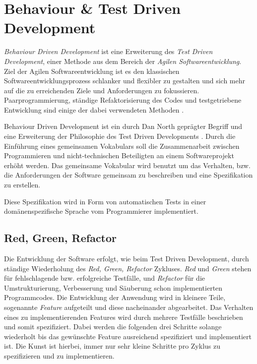\section{Behaviour \& Test Driven Development}

\textit{Behaviour Driven Development} ist eine Erweiterung des
\textit{Test Driven Development}, einer Methode aus dem Bereich der
\textit{Agilen Softwareentwicklung}. Ziel der Agilen
Softwareentwicklung ist es den klassischen Softwareentwicklungsprozess
schlanker und flexibler zu gestalten und sich mehr auf die zu
erreichenden Ziele und Anforderungen zu
fokussieren. Paarprogrammierung, ständige Refaktorisierung des Codes
und testgetriebene Entwicklung sind einige der dabei verwendeten
Methoden \cite{wiki:agile}.

Behaviour Driven Development ist ein durch Dan North geprägter Begriff
und eine Erweiterung der Philosophie des Test Driven Developments
\cite{wiki:bdd}. Durch die Einführung eines gemeinsamen Vokabulars
soll die Zusammenarbeit zwischen Programmieren und nicht-technischen
Beteiligten an einem Softwareprojekt erhöht werden. Das gemeinsame
Vokabular wird benutzt um das Verhalten, bzw. die Anforderungen der
Software gemeinsam zu beschreiben und eine Spezifikation zu erstellen.

Diese Spezifikation wird in Form von automatischen Tests in einer
domänen\-spezifische Sprache vom Programmierer implementiert.

\subsection{Red, Green, Refactor}

Die Entwicklung der Software erfolgt, wie beim Test Driven
Development, durch ständige Wiederholung des \textit{Red, Green,
  Refactor} Zykluses. \textit{Red} und \textit{Green} stehen für
fehlschlagende bzw. erfolgreiche Testfälle, und \textit{Refactor} für
die Umstrukturierung, Verbesserung und Säuberung schon implementierten
Programmcodes. Die Entwicklung der Anwendung wird in kleinere Teile,
sogenannte \textit{Feature} aufgeteilt und diese nacheinander
abgearbeitet. Das Verhalten eines zu implementierenden Features wird
durch mehrere Testfälle beschrieben und somit spezifiziert. Dabei
werden die folgenden drei Schritte solange wiederholt bis das
gewünschte Feature ausreichend spezifiziert und implementiert ist. Die
Kunst ist hierbei, immer nur sehr kleine Schritte pro Zyklus zu
spezifizieren und zu implementieren.

